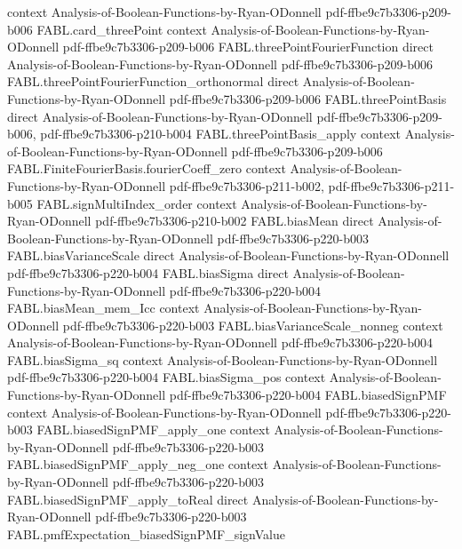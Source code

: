 \begin{theorem}
  {context}
  {Analysis-of-Boolean-Functions-by-Ryan-ODonnell}
  {pdf-ffbe9c7b3306-p209-b006}
\proofstep
  {FABL.card_threePoint}
  {context}
  {Analysis-of-Boolean-Functions-by-Ryan-ODonnell}
  {pdf-ffbe9c7b3306-p209-b006}
\proofstep
  {FABL.threePointFourierFunction}
  {direct}
  {Analysis-of-Boolean-Functions-by-Ryan-ODonnell}
  {pdf-ffbe9c7b3306-p209-b006}
\proofstep
  {FABL.threePointFourierFunction_orthonormal}
  {direct}
  {Analysis-of-Boolean-Functions-by-Ryan-ODonnell}
  {pdf-ffbe9c7b3306-p209-b006}
\proofstep
  {FABL.threePointBasis}
  {direct}
  {Analysis-of-Boolean-Functions-by-Ryan-ODonnell}
  {pdf-ffbe9c7b3306-p209-b006,
    pdf-ffbe9c7b3306-p210-b004}
\proofstep
  {FABL.threePointBasis_apply}
  {context}
  {Analysis-of-Boolean-Functions-by-Ryan-ODonnell}
  {pdf-ffbe9c7b3306-p209-b006}
\proofstep
  {FABL.FiniteFourierBasis.fourierCoeff_zero}
  {context}
  {Analysis-of-Boolean-Functions-by-Ryan-ODonnell}
  {pdf-ffbe9c7b3306-p211-b002,
    pdf-ffbe9c7b3306-p211-b005}
\proofstep
  {FABL.signMultiIndex_order}
  {context}
  {Analysis-of-Boolean-Functions-by-Ryan-ODonnell}
  {pdf-ffbe9c7b3306-p210-b002}
\proofstep
  {FABL.biasMean}
  {direct}
  {Analysis-of-Boolean-Functions-by-Ryan-ODonnell}
  {pdf-ffbe9c7b3306-p220-b003}
\proofstep
  {FABL.biasVarianceScale}
  {direct}
  {Analysis-of-Boolean-Functions-by-Ryan-ODonnell}
  {pdf-ffbe9c7b3306-p220-b004}
\proofstep
  {FABL.biasSigma}
  {direct}
  {Analysis-of-Boolean-Functions-by-Ryan-ODonnell}
  {pdf-ffbe9c7b3306-p220-b004}
\proofstep
  {FABL.biasMean_mem_Icc}
  {context}
  {Analysis-of-Boolean-Functions-by-Ryan-ODonnell}
  {pdf-ffbe9c7b3306-p220-b003}
\proofstep
  {FABL.biasVarianceScale_nonneg}
  {context}
  {Analysis-of-Boolean-Functions-by-Ryan-ODonnell}
  {pdf-ffbe9c7b3306-p220-b004}
\proofstep
  {FABL.biasSigma_sq}
  {context}
  {Analysis-of-Boolean-Functions-by-Ryan-ODonnell}
  {pdf-ffbe9c7b3306-p220-b004}
\proofstep
  {FABL.biasSigma_pos}
  {context}
  {Analysis-of-Boolean-Functions-by-Ryan-ODonnell}
  {pdf-ffbe9c7b3306-p220-b004}
\proofstep
  {FABL.biasedSignPMF}
  {context}
  {Analysis-of-Boolean-Functions-by-Ryan-ODonnell}
  {pdf-ffbe9c7b3306-p220-b003}
\proofstep
  {FABL.biasedSignPMF_apply_one}
  {context}
  {Analysis-of-Boolean-Functions-by-Ryan-ODonnell}
  {pdf-ffbe9c7b3306-p220-b003}
\proofstep
  {FABL.biasedSignPMF_apply_neg_one}
  {context}
  {Analysis-of-Boolean-Functions-by-Ryan-ODonnell}
  {pdf-ffbe9c7b3306-p220-b003}
\proofstep
  {FABL.biasedSignPMF_apply_toReal}
  {direct}
  {Analysis-of-Boolean-Functions-by-Ryan-ODonnell}
  {pdf-ffbe9c7b3306-p220-b003}
\proofstep
  {FABL.pmfExpectation_biasedSignPMF_signValue}

\end{theorem}
